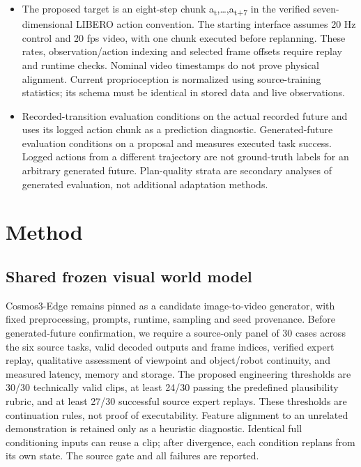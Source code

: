 \documentclass[11pt,a4paper]{article}
\begin{document}
\begin{itemize}\item The proposed target is an eight-step chunk a\textsubscript{t},\ldots{},a\textsubscript{t}\textsubscript{+}\textsubscript{7} in the verified seven-dimensional LIBERO action convention. The starting interface assumes 20 Hz control and 20 fps video, with one chunk executed before replanning. These rates, observation/action indexing and selected frame offsets require replay and runtime checks. Nominal video timestamps do not prove physical alignment. Current proprioception is normalized using source-training statistics; its schema must be identical in stored data and live observations.\end{itemize}

\begin{itemize}\item Recorded-transition evaluation conditions on the actual recorded future and uses its logged action chunk as a prediction diagnostic. Generated-future evaluation conditions on a proposal and measures executed task success. Logged actions from a different trajectory are not ground-truth labels for an arbitrary generated future. Plan-quality strata are secondary analyses of generated evaluation, not additional adaptation methods.\end{itemize}

\section{Method}

\subsection{Shared frozen visual world model}

Cosmos3-Edge remains pinned as a candidate image-to-video generator, with fixed preprocessing, prompts, runtime, sampling and seed provenance. Before generated-future confirmation, we require a source-only panel of 30 cases across the six source tasks, valid decoded outputs and frame indices, verified expert replay, qualitative assessment of viewpoint and object/robot continuity, and measured latency, memory and storage. The proposed engineering thresholds are 30/30 technically valid clips, at least 24/30 passing the predefined plausibility rubric, and at least 27/30 successful source expert replays. These thresholds are continuation rules, not proof of executability. Feature alignment to an unrelated demonstration is retained only as a heuristic diagnostic. Identical full conditioning inputs can reuse a clip; after divergence, each condition replans from its own state. The source gate and all failures are reported.
\end{document}
